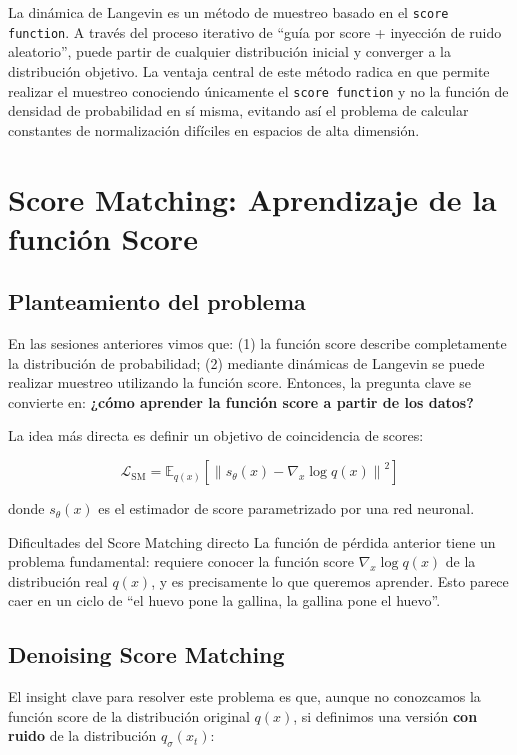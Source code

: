 \documentclass[a4paper]{article}
\begin{document}
La dinámica de Langevin es un método de muestreo basado en el \texttt{score function}. A través del proceso iterativo de ``guía por score + inyección de ruido aleatorio'', puede partir de cualquier distribución inicial y converger a la distribución objetivo. La ventaja central de este método radica en que permite realizar el muestreo conociendo únicamente el \texttt{score function} y no la función de densidad de probabilidad en sí misma, evitando así el problema de calcular constantes de normalización difíciles en espacios de alta dimensión.


\section{Score Matching: Aprendizaje de la función Score}

\subsection{Planteamiento del problema}

En las sesiones anteriores vimos que: (1) la función score describe completamente la distribución de probabilidad; (2) mediante dinámicas de Langevin se puede realizar muestreo utilizando la función score. Entonces, la pregunta clave se convierte en: \textbf{¿cómo aprender la función score a partir de los datos?}

La idea más directa es definir un objetivo de coincidencia de scores:

$$\mathcal{L}_{\text{SM}} = \mathbb{E}_{q(x)}\left[\left\| s_\theta(x) - \nabla_x \log q(x) \right\|^2\right]$$

donde $s_\theta(x)$ es el estimador de score parametrizado por una red neuronal.

\begin{warningbox}{Dificultades del Score Matching directo}
La función de pérdida anterior tiene un problema fundamental: requiere conocer la función score $\nabla_x \log q(x)$ de la distribución real $q(x)$, y es precisamente lo que queremos aprender. Esto parece caer en un ciclo de ``el huevo pone la gallina, la gallina pone el huevo''.
\end{warningbox}

\subsection{Denoising Score Matching}

El insight clave para resolver este problema es que, aunque no conozcamos la función score de la distribución original $q(x)$, si definimos una versión \textbf{con ruido} de la distribución $q_\sigma(x_t)$:
\end{document}
